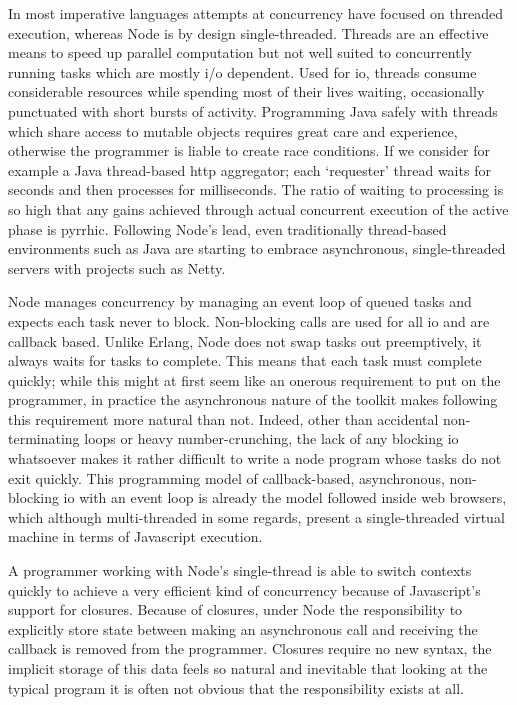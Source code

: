 \documentclass[]{article}
\begin{document}
In most imperative languages attempts at concurrency have focused on
threaded execution, whereas Node is by design single-threaded. Threads
are an effective means to speed up parallel computation but not well
suited to concurrently running tasks which are mostly i/o dependent.
Used for io, threads consume considerable resources while spending most
of their lives waiting, occasionally punctuated with short bursts of
activity. Programming Java safely with threads which share access to
mutable objects requires great care and experience, otherwise the
programmer is liable to create race conditions. If we consider for
example a Java thread-based http aggregator; each `requester' thread
waits for seconds and then processes for milliseconds. The ratio of
waiting to processing is so high that any gains achieved through actual
concurrent execution of the active phase is pyrrhic. Following Node's
lead, even traditionally thread-based environments such as Java are
starting to embrace asynchronous, single-threaded servers with projects
such as Netty.

Node manages concurrency by managing an event loop of queued tasks and
expects each task never to block. Non-blocking calls are used for all io
and are callback based. Unlike Erlang, Node does not swap tasks out
preemptively, it always waits for tasks to complete. This means that
each task must complete quickly; while this might at first seem like an
onerous requirement to put on the programmer, in practice the
asynchronous nature of the toolkit makes following this requirement more
natural than not. Indeed, other than accidental non-terminating loops or
heavy number-crunching, the lack of any blocking io whatsoever makes it
rather difficult to write a node program whose tasks do not exit
quickly. This programming model of callback-based, asynchronous,
non-blocking io with an event loop is already the model followed inside
web browsers, which although multi-threaded in some regards, present a
single-threaded virtual machine in terms of Javascript execution.

A programmer working with Node's single-thread is able to switch
contexts quickly to achieve a very efficient kind of concurrency because
of Javascript's support for closures. Because of closures, under Node
the responsibility to explicitly store state between making an
asynchronous call and receiving the callback is removed from the
programmer. Closures require no new syntax, the implicit storage of this
data feels so natural and inevitable that looking at the typical program
it is often not obvious that the responsibility exists at all.
\end{document}
